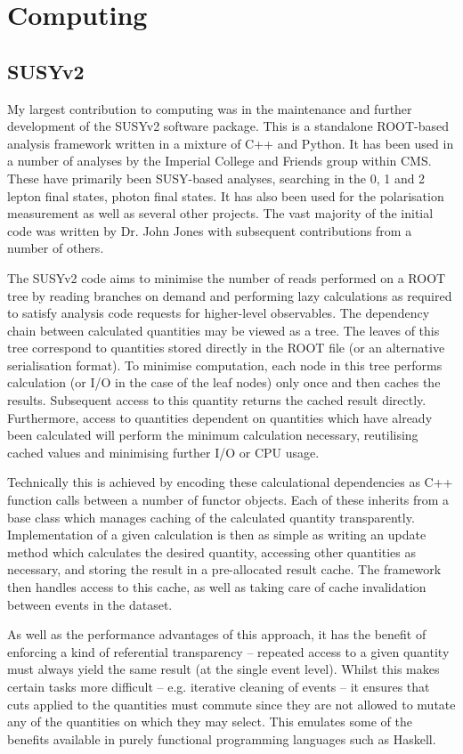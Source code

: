 \chapter{Computing}
\section{SUSYv2}
My largest contribution to computing was in the maintenance and further
development of the \ac{SUSYv2} software package. This is a standalone
\ac{ROOT}-based analysis framework written in a mixture of C++ and Python. It
has been used in a number of analyses by the Imperial College and Friends group
within \ac{CMS}. These have primarily been \ac{SUSY}-based analyses, searching
in the 0, 1 and 2 lepton final states, photon final states. It has also been
used for the \PW polarisation measurement as well as several other projects. The
vast majority of the initial code was written by Dr. John Jones with subsequent
contributions from a number of others.

The \ac{SUSYv2} code aims to minimise the number of reads performed on a
\ac{ROOT} tree by reading branches on demand and performing lazy calculations as
required to satisfy analysis code requests for higher-level observables. The
dependency chain between calculated quantities may be viewed as a tree. The
leaves of this tree correspond to quantities stored directly in the \ac{ROOT}
file (or an alternative serialisation format). To minimise computation, each
node in this tree performs calculation (or I/O in the case of the leaf nodes)
only once and then caches the results. Subsequent access to this quantity
returns the cached result directly. Furthermore, access to quantities dependent
on quantities which have already been calculated will perform the minimum
calculation necessary, reutilising cached values and minimising further I/O or
CPU usage.

Technically this is achieved by encoding these calculational dependencies as C++
function calls between a number of functor objects. Each of these inherits from
a base class which manages caching of the calculated quantity
transparently. Implementation of a given calculation is then as simple as
writing an update method which calculates the desired quantity, accessing other
quantities as necessary, and storing the result in a pre-allocated result
cache. The framework then handles access to this cache, as well as taking care
of cache invalidation between events in the dataset.

As well as the performance advantages of this approach, it has the benefit of
enforcing a kind of referential transparency -- repeated access to a given
quantity must always yield the same result (at the single event level). Whilst
this makes certain tasks more difficult -- e.g. iterative cleaning of events -- it
ensures that cuts applied to the quantities must commute since they are not
allowed to mutate any of the quantities on which they may select. This emulates
some of the benefits available in purely functional programming languages such
as Haskell.
